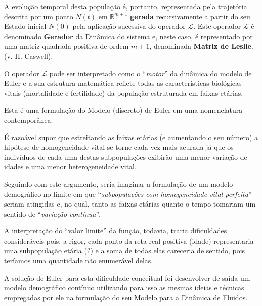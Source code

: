 A evolução temporal desta população é, portanto, representada pela trajetória descrita por um ponto \(N(t)\) em \(\mathbb{R}^{m+1}\) \textbf{gerada} recursivamente a partir do seu Estado inicial \(N(0)\) pela aplicação sucessiva do operador \(\mathcal{L}\). Este operador \(\mathcal{L}\) é denominado \textbf{Gerador} da Dinâmica do sistema e, neste caso, é representado por uma matriz quadrada positiva de ordem \(m+1\), denominada \textbf{Matriz de Leslie}. (v. H. Caswell).

O operador \(\mathcal{L}\) pode ser interpretado como o ``\textit{motor}'' da dinâmica do modelo de Euler e a sua estrutura matemática reflete todas as características biológicas vitais (mortalidade e fertilidade) da população estruturada em faixas etárias.

Esta é uma formulação do Modelo (discreto) de Euler em uma nomenclatura contemporânea.


É razoável supor que estreitando as faixas etárias (e aumentando o seu número) a hipótese de homogeneidade vital se torne cada vez mais acurada já que os indivíduos de cada uma destas subpopulações exibirão uma menor variação de idades e uma menor heterogeneidade vital.

Seguindo com este argumento, seria imaginar a formulação de um modelo demográfico no limite em que ``\textit{subpopulações com homogeneidade vital perfeita}'' seriam atingidas e, no qual, tanto as faixas etárias quanto o tempo tomariam um sentido de ``\textit{variação contínua}''.

A interpretação do ``valor limite'' da função, todavia, traria dificuldades consideráveis pois, a rigor, cada ponto da reta real positiva (idade) representaria uma subpopulação etária (?) e a soma de todas elas careceria de sentido, pois teríamos uma quantidade não enumerável delas.

A solução de Euler para esta dificuldade conceitual foi desenvolver de saída um modelo demográfico contínuo utilizando para isso as mesmas ideias e técnicas empregadas por ele na formulação do seu Modelo para a Dinâmica de Fluidos.

